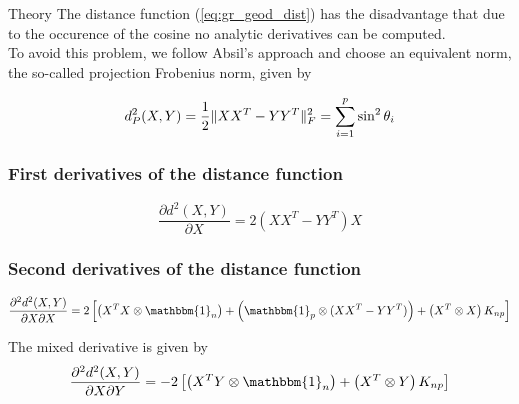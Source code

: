 \begin{chapter}{Theory}
The distance function (\ref{eq:gr_geod_dist}) has the disadvantage that due to the occurence of the cosine no analytic derivatives can be computed.\\

To avoid this problem, we follow Absil's \cite{absil_GR} approach and choose an equivalent norm, the so-called projection Frobenius norm, given by

\begin{equation}
    d_P^2(X,Y) = \frac{1}{2}\| XX^T-YY^T \|_{F}^{2} = \sum_{i=1}^p\sin^2\theta_i
\end{equation}




\subsubsection{First derivatives of the distance function} %
\label{ssub:First derivatives of the distance function}

\begin{equation}
    \label{eq:gr_x_der}
    \frac{\partial d^2(X,Y)}{\partial X} = 2\left(XX^T-YY^T\right)X
\end{equation}



\subsubsection{Second derivatives of the distance function} %
\label{ssub:Second derivatives of the distance function}

\begin{equation}
    \label{eq:gr_xx_der}
    \frac{\partial^2 d^2(X,Y)}{\partial X\partial X} = 2
    \left[
	\left(X^TX\otimes \mathbbm{1}_{n}\right) 
	+ \left(\mathbbm{1}_p\otimes (XX^T-YY^T)\right)
	+ \left(X^T\otimes X\right)K_{np}
    \right]
\end{equation}

The mixed derivative is given by
\begin{equation}
    \label{eq:gr_xy_der}
    \frac{\partial^2 d^2(X,Y)}{\partial X\partial Y} = -2\left[\left(X^TY\otimes \mathbbm{1}_{n}\right) + \left(X^T\otimes Y\right)K_{np}\right]
\end{equation}






\end{chapter}
